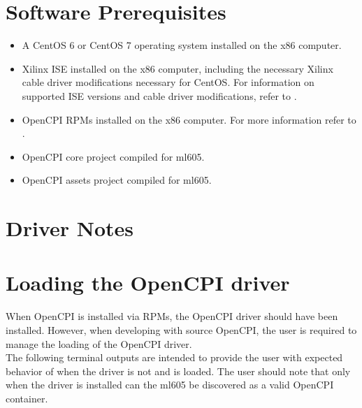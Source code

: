 \documentclass{article}
\begin{document}
\section{Software Prerequisites}
\begin{itemize}
\item A CentOS 6 or CentOS 7 operating system installed on the x86 computer.
\item Xilinx ISE installed on the x86 computer, including the necessary Xilinx cable driver modifications necessary for CentOS. For information on supported ISE versions and cable driver modifications, refer to \cite{fpga_vendor_tool_guide}.
\item OpenCPI RPMs installed on the x86 computer. For more information refer to \cite{rpm_installation_guide}.
\item OpenCPI core project compiled for ml605.
\item OpenCPI assets project compiled for ml605.
\end{itemize}



\section{Driver Notes}


\section{Loading the OpenCPI driver}
When OpenCPI is installed via RPMs, the OpenCPI driver should have been installed. However, when developing with source OpenCPI, the user is required to manage the loading of the OpenCPI driver. \\
The following terminal outputs are intended to provide the user with expected behavior of when the driver is not and is loaded. The user should note that only when the driver is installed can the ml605 be discovered as a valid OpenCPI container.
\end{document}
